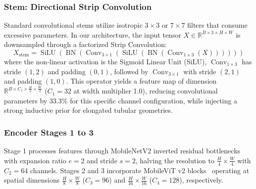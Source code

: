 \documentclass[conference]{IEEEtran}
\begin{document}
\subsubsection{Stem: Directional Strip Convolution}
Standard convolutional stems utilize isotropic $3\times3$ or $7\times7$ filters that consume excessive parameters. In our architecture, the input tensor $X \in \mathbb{R}^{B \times 3 \times H \times W}$ is downsampled through a factorized Strip Convolution:
\begin{equation}
    X_{\text{stem}} = \operatorname{SiLU}\left(\operatorname{BN}\left(\operatorname{Conv}_{3\times1}\left(\operatorname{SiLU}\left(\operatorname{BN}\left(\operatorname{Conv}_{1\times3}(X)\right)\right)\right)\right)\right)
    \label{eq:strip_conv}
\end{equation}
where the non-linear activation is the Sigmoid Linear Unit (SiLU), $\operatorname{Conv}_{1\times3}$ has stride $(1, 2)$ and padding $(0, 1)$, followed by $\operatorname{Conv}_{3\times1}$ with stride $(2, 1)$ and padding $(1, 0)$. This operator yields a feature map of dimension $\mathbb{R}^{B \times C_1 \times \frac{H}{2} \times \frac{W}{2}}$ ($C_1=32$ at width multiplier 1.0), reducing convolutional parameters by 33.3\% for this specific channel configuration, while injecting a strong inductive prior for elongated tubular geometries.

\subsubsection{Encoder Stages 1 to 3}
Stage 1 processes features through MobileNetV2 inverted residual bottlenecks~\cite{sandler2018mobilenetv2} with expansion ratio $e=2$ and stride $s=2$, halving the resolution to $\frac{H}{4} \times \frac{W}{4}$ with $C_2=64$ channels. Stages 2 and 3 incorporate MobileViT v2 blocks~\cite{mehta2022mobilevit} operating at spatial dimensions $\frac{H}{8} \times \frac{W}{8}$ ($C_3=96$) and $\frac{H}{16} \times \frac{W}{16}$ ($C_4=128$), respectively.
\end{document}
